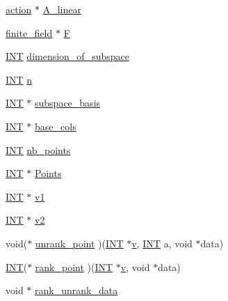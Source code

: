 \begin{DoxyCompactItemize}
\item 
\mbox{\hyperlink{classaction}{action}} $\ast$ \mbox{\hyperlink{classaction__on__cosets_abf9492e4bfbb0ca3423530bc3a40e003}{A\+\_\+linear}}
\item 
\mbox{\hyperlink{classfinite__field}{finite\+\_\+field}} $\ast$ \mbox{\hyperlink{classaction__on__cosets_a4b0c9211a324e57934a553202dcfc8c1}{F}}
\item 
\mbox{\hyperlink{galois_8h_a09fddde158a3a20bd2dcadb609de11dc}{I\+NT}} \mbox{\hyperlink{classaction__on__cosets_a599de658e463ad16f613a8fe3c1558d2}{dimension\+\_\+of\+\_\+subspace}}
\item 
\mbox{\hyperlink{galois_8h_a09fddde158a3a20bd2dcadb609de11dc}{I\+NT}} \mbox{\hyperlink{classaction__on__cosets_a8484abeee72ef07d75525c8cc158a22b}{n}}
\item 
\mbox{\hyperlink{galois_8h_a09fddde158a3a20bd2dcadb609de11dc}{I\+NT}} $\ast$ \mbox{\hyperlink{classaction__on__cosets_ac375cf7a4212703d7e300a0ce100d8b2}{subspace\+\_\+basis}}
\item 
\mbox{\hyperlink{galois_8h_a09fddde158a3a20bd2dcadb609de11dc}{I\+NT}} $\ast$ \mbox{\hyperlink{classaction__on__cosets_aadd4ffaa5af22372629ef4e806903590}{base\+\_\+cols}}
\item 
\mbox{\hyperlink{galois_8h_a09fddde158a3a20bd2dcadb609de11dc}{I\+NT}} \mbox{\hyperlink{classaction__on__cosets_aea47e8672c42914671e089a56f46ce8a}{nb\+\_\+points}}
\item 
\mbox{\hyperlink{galois_8h_a09fddde158a3a20bd2dcadb609de11dc}{I\+NT}} $\ast$ \mbox{\hyperlink{classaction__on__cosets_a692e4bffcc20dd5b966a7cc8847c8272}{Points}}
\item 
\mbox{\hyperlink{galois_8h_a09fddde158a3a20bd2dcadb609de11dc}{I\+NT}} $\ast$ \mbox{\hyperlink{classaction__on__cosets_a3caf8e52f0ff523982379b86da8d1db4}{v1}}
\item 
\mbox{\hyperlink{galois_8h_a09fddde158a3a20bd2dcadb609de11dc}{I\+NT}} $\ast$ \mbox{\hyperlink{classaction__on__cosets_ae29df941119f7e1046b45a9ccd54be0a}{v2}}
\item 
void($\ast$ \mbox{\hyperlink{classaction__on__cosets_ac6479fd4aaa39cdbe6242e557c71560f}{unrank\+\_\+point}} )(\mbox{\hyperlink{galois_8h_a09fddde158a3a20bd2dcadb609de11dc}{I\+NT}} $\ast$\mbox{\hyperlink{simeon_8_c_aeb3f3030944801b163bc3b829a7f6710}{v}}, \mbox{\hyperlink{galois_8h_a09fddde158a3a20bd2dcadb609de11dc}{I\+NT}} a, void $\ast$data)
\item 
\mbox{\hyperlink{galois_8h_a09fddde158a3a20bd2dcadb609de11dc}{I\+NT}}($\ast$ \mbox{\hyperlink{classaction__on__cosets_ab7d62bbeaba4773bc38f9fca642089e0}{rank\+\_\+point}} )(\mbox{\hyperlink{galois_8h_a09fddde158a3a20bd2dcadb609de11dc}{I\+NT}} $\ast$\mbox{\hyperlink{simeon_8_c_aeb3f3030944801b163bc3b829a7f6710}{v}}, void $\ast$data)
\item 
void $\ast$ \mbox{\hyperlink{classaction__on__cosets_ae5027b43d2e97332830324527098623d}{rank\+\_\+unrank\+\_\+data}}
\end{DoxyCompactItemize}


